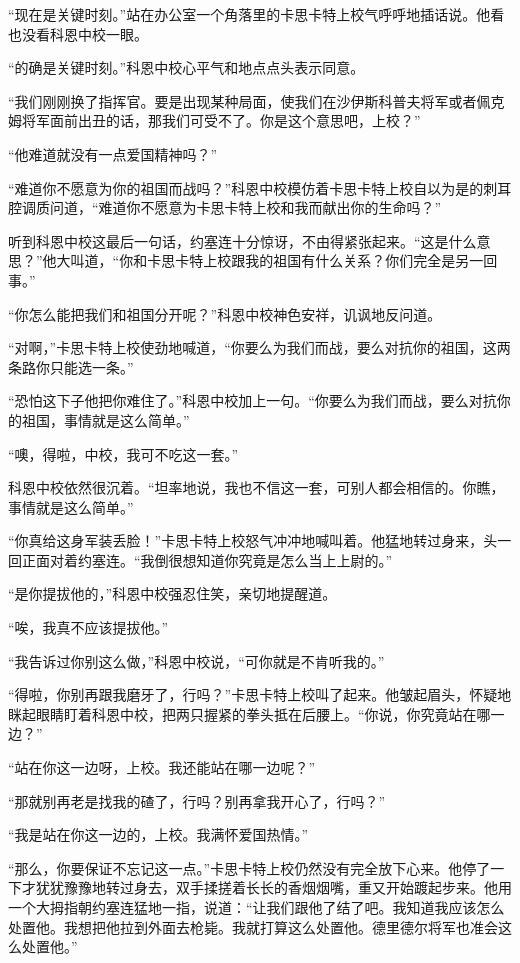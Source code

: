     “现在是关键时刻。”站在办公室一个角落里的卡思卡特上校气呼呼地插话说。他看也没看科恩中校一眼。

    “的确是关键时刻。”科恩中校心平气和地点点头表示同意。

    “我们刚刚换了指挥官。要是出现某种局面，使我们在沙伊斯科普夫将军或者佩克姆将军面前出丑的话，那我们可受不了。你是这个意思吧，上校？”

    “他难道就没有一点爱国精神吗？”

    “难道你不愿意为你的祖国而战吗？”科恩中校模仿着卡思卡特上校自以为是的刺耳腔调质问道，“难道你不愿意为卡思卡特上校和我而献出你的生命吗？”

    听到科恩中校这最后一句话，约塞连十分惊讶，不由得紧张起来。“这是什么意思？”他大叫道，“你和卡思卡特上校跟我的祖国有什么关系？你们完全是另一回事。”

    “你怎么能把我们和祖国分开呢？”科恩中校神色安祥，讥讽地反问道。

    “对啊，”卡思卡特上校使劲地喊道，“你要么为我们而战，要么对抗你的祖国，这两条路你只能选一条。”

    “恐怕这下子他把你难住了。”科恩中校加上一句。“你要么为我们而战，要么对抗你的祖国，事情就是这么简单。”

    “噢，得啦，中校，我可不吃这一套。”

    科恩中校依然很沉着。“坦率地说，我也不信这一套，可别人都会相信的。你瞧，事情就是这么简单。”

    “你真给这身军装丢脸！”卡思卡特上校怒气冲冲地喊叫着。他猛地转过身来，头一回正面对着约塞连。“我倒很想知道你究竟是怎么当上上尉的。”

    “是你提拔他的，”科恩中校强忍住笑，亲切地提醒道。

    “唉，我真不应该提拔他。”

    “我告诉过你别这么做，”科恩中校说，“可你就是不肯听我的。”

    “得啦，你别再跟我磨牙了，行吗？”卡思卡特上校叫了起来。他皱起眉头，怀疑地眯起眼睛盯着科恩中校，把两只握紧的拳头抵在后腰上。“你说，你究竟站在哪一边？”

    “站在你这一边呀，上校。我还能站在哪一边呢？”

    “那就别再老是找我的碴了，行吗？别再拿我开心了，行吗？”

    “我是站在你这一边的，上校。我满怀爱国热情。”

    “那么，你要保证不忘记这一点。”卡思卡特上校仍然没有完全放下心来。他停了一下才犹犹豫豫地转过身去，双手揉搓着长长的香烟烟嘴，重又开始踱起步来。他用一个大拇指朝约塞连猛地一指，说道：“让我们跟他了结了吧。我知道我应该怎么处置他。我想把他拉到外面去枪毙。我就打算这么处置他。德里德尔将军也准会这么处置他。”

